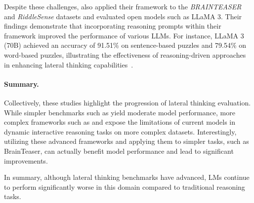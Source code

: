 Despite these challenges, \textcite{chenWeakevalStrongEvaluatingEliciting2024} also applied their framework to the \textit{BRAINTEASER} and \textit{RiddleSense} datasets and evaluated open models such as \ac{LLaMA} 3. Their findings demonstrate that incorporating reasoning prompts within their framework improved the performance of various \acp{LLM}. For instance, \ac{LLaMA} 3 (70B) achieved an accuracy of 91.51\% on sentence-based puzzles and 79.54\% on word-based puzzles, illustrating the effectiveness of reasoning-driven approaches in enhancing lateral thinking capabilities~\cite{chenWeakevalStrongEvaluatingEliciting2024}.

\paragraph{Summary.} Collectively, these studies highlight the progression of lateral thinking evaluation. While simpler benchmarks such as \textcite{jiangBRAINTEASERLateralThinking2023} yield moderate model performance, more complex frameworks such as \textcite{huangLatEvalInteractiveLLMs2024} and \textcite{chenWeakevalStrongEvaluatingEliciting2024} expose the limitations of current models in dynamic interactive reasoning tasks on more complex datasets. Interestingly, utilizing these advanced frameworks and applying them to simpler tasks, such as BrainTeaser, can actually benefit model performance and lead to significant improvements.

In summary, although lateral thinking benchmarks have advanced, \acp{LM} continue to perform significantly worse in this domain compared to traditional reasoning tasks.